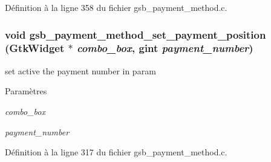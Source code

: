 Définition à la ligne 358 du fichier gsb\_\-payment\_\-method.c.

\subsubsection[{gsb\_\-payment\_\-method\_\-set\_\-payment\_\-position}]{\setlength{\rightskip}{0pt plus 5cm}void gsb\_\-payment\_\-method\_\-set\_\-payment\_\-position (GtkWidget $\ast$ {\em combo\_\-box}, \/  gint {\em payment\_\-number})}\label{gsb__payment__method_8c_ab12f5c754ced75c920803d84259a2128}
set active the payment number in param


\begin{DoxyParams}{Paramètres}
\item[{\em combo\_\-box}]\item[{\em payment\_\-number}]\end{DoxyParams}


Définition à la ligne 317 du fichier gsb\_\-payment\_\-method.c.

